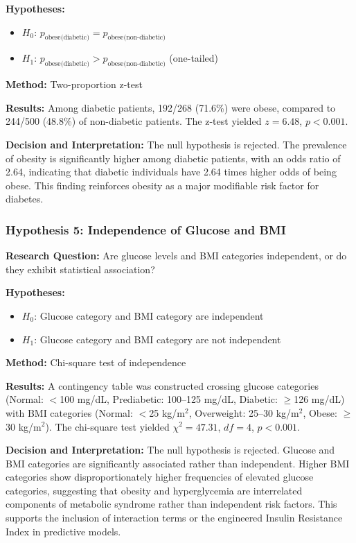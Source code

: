 \documentclass[12pt]{article}
\begin{document}
\textbf{Hypotheses:}
\begin{itemize}
    \item $H_0$: $p_{\text{obese(diabetic)}} = p_{\text{obese(non-diabetic)}}$
    \item $H_1$: $p_{\text{obese(diabetic)}} > p_{\text{obese(non-diabetic)}}$ (one-tailed)
\end{itemize}

\textbf{Method:} Two-proportion z-test

\textbf{Results:} Among diabetic patients, 192/268 (71.6\%) were obese, compared to 244/500 (48.8\%) of non-diabetic patients. The z-test yielded $z = 6.48$, $p < 0.001$.

\textbf{Decision and Interpretation:} The null hypothesis is rejected. The prevalence of obesity is significantly higher among diabetic patients, with an odds ratio of 2.64, indicating that diabetic individuals have 2.64 times higher odds of being obese. This finding reinforces obesity as a major modifiable risk factor for diabetes.

\subsubsection{Hypothesis 5: Independence of Glucose and BMI}

\textbf{Research Question:} Are glucose levels and BMI categories independent, or do they exhibit statistical association?

\textbf{Hypotheses:}
\begin{itemize}
    \item $H_0$: Glucose category and BMI category are independent
    \item $H_1$: Glucose category and BMI category are not independent
\end{itemize}

\textbf{Method:} Chi-square test of independence

\textbf{Results:} A contingency table was constructed crossing glucose categories (Normal: $<$100 mg/dL, Prediabetic: 100--125 mg/dL, Diabetic: $\geq$126 mg/dL) with BMI categories (Normal: $<$25 kg/m$^2$, Overweight: 25--30 kg/m$^2$, Obese: $\geq$30 kg/m$^2$). The chi-square test yielded $\chi^2 = 47.31$, $df = 4$, $p < 0.001$.

\textbf{Decision and Interpretation:} The null hypothesis is rejected. Glucose and BMI categories are significantly associated rather than independent. Higher BMI categories show disproportionately higher frequencies of elevated glucose categories, suggesting that obesity and hyperglycemia are interrelated components of metabolic syndrome rather than independent risk factors. This supports the inclusion of interaction terms or the engineered Insulin Resistance Index in predictive models.
\end{document}
